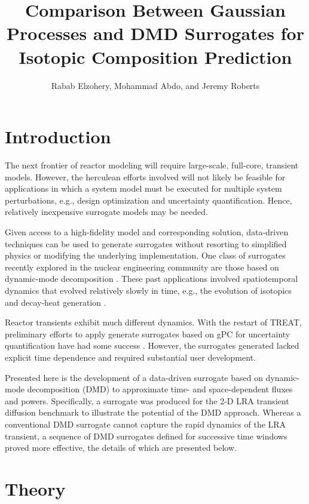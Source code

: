 \documentclass{anstrans}
\title{Comparison Between Gaussian Processes and DMD Surrogates for Isotopic Composition Prediction}
\author{Rabab Elzohery, Mohammad Abdo, and Jeremy Roberts}
\institute{
Department of Mechanical \& Nuclear Engineering, Kansas State University, Manhattan, KS 66506
}
\begin{document}
\section{Introduction}

The next frontier of reactor modeling will require large-scale, full-core, transient models.
However, the herculean efforts involved will not likely be feasible for applications in which a system model must be executed for multiple system perturbations, e.g., design optimization and uncertainty quantification.
Hence, relatively  inexpensive surrogate models may be needed.

Given access to a high-fidelity model and corresponding solution, data-driven techniques can be used to generate surrogates without resorting to simplified physics or modifying the underlying implementation.  
One class of surrogates recently explored in the nuclear engineering community are those based on dynamic-mode decomposition \cite{}.  
These past applications involved spatiotemporal dynamics that evolved relatively slowly in time, e.g., the evolution of isotopics \cite{} and decay-heat generation \cite{}.

Reactor transients exhibit much different dynamics.
With the restart of TREAT, preliminary efforts to apply generate surrogates based on gPC for uncertainty quantification have had some success \cite{}.
However, the surrogates generated lacked explicit time dependence and required substantial user development.

Presented here is the development of a data-driven surrogate based on dynamic-mode decomposition (DMD) to approximate time- and space-dependent fluxes and powers.
Specifically, a surrogate was produced for the 2-D LRA transient diffusion benchmark to illustrate the potential of the DMD approach. 
Whereas a conventional DMD surrogate cannot capture the rapid dynamics of the LRA transient, a sequence of DMD surrogates defined for successive time windows proved more effective, the details of which are presented below.


\section{Theory}
\end{document}

